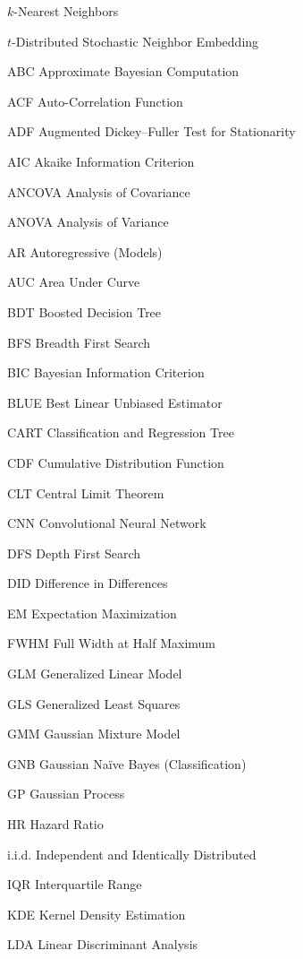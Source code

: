 \begin{symbollist}
  \item[\kNN] $k$-Nearest Neighbors
  \item[\tSNE] $t$-Distributed Stochastic Neighbor Embedding
  \item[ABC] Approximate Bayesian Computation
  \item[ACF] Auto-Correlation Function
  \item[ADF] Augmented Dickey--Fuller Test for Stationarity
  \item[AIC] Akaike Information Criterion
  \item[ANCOVA] Analysis of Covariance
  \item[ANOVA] Analysis of Variance
  \item[AR] Autoregressive (Models)
  \item[AUC] Area Under Curve
  \item[BDT] Boosted Decision Tree
  \item[BFS] Breadth First Search
  \item[BIC] Bayesian Information Criterion
  \item[BLUE] Best Linear Unbiased Estimator
  \item[CART] Classification and Regression Tree
  \item[CDF] Cumulative Distribution Function
  \item[CLT] Central Limit Theorem
  \item[CNN] Convolutional Neural Network
  \item[DFS] Depth First Search
  \item[DID] Difference in Differences
  \item[EM] Expectation Maximization
  \item[FWHM] Full Width at Half Maximum
  \item[GLM] Generalized Linear Model
  \item[GLS] Generalized Least Squares
  \item[GMM] Gaussian Mixture Model
  \item[GNB] Gaussian N{a\"i}ve Bayes (Classification)
  \item[GP] Gaussian Process
  \item[HR] Hazard Ratio
  \item[i.i.d.] Independent and Identically Distributed
  \item[IQR] Interquartile Range
  \item[KDE] Kernel Density Estimation
  \item[LDA] Linear Discriminant Analysis

\end{symbollist}

